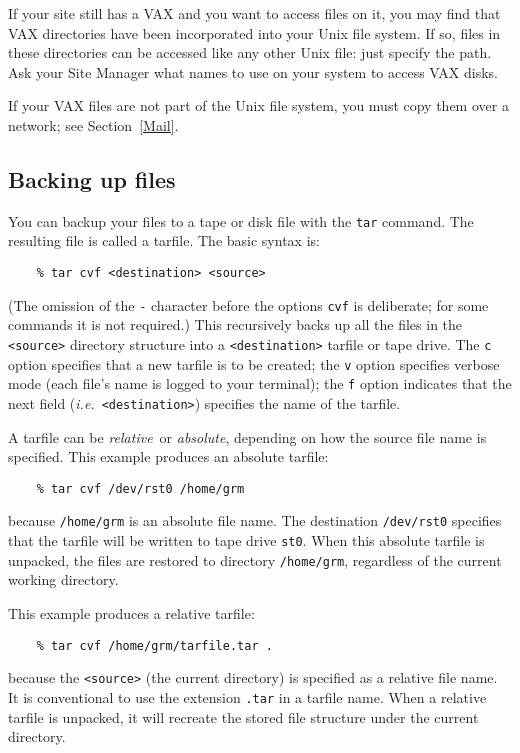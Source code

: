 If your site still has a VAX and you want to access files on it, you may find
that VAX directories have been incorporated into your Unix file system.
If so, files in these directories can be accessed like any other Unix file: just
specify the path.
Ask your Site Manager what names to use on your system to access VAX disks.

If your VAX files are not part of the Unix file system, you must copy
them over a network; see Section~\ref{Mail}.

\subsection{Backing up files}

You can backup your files to a tape or disk file with the {\tt tar} command.
The resulting file is called a tarfile.
The basic syntax is:
\begin{verbatim}
    % tar cvf <destination> <source>
\end{verbatim}
(The omission of the {\tt -} character before the options {\tt cvf} is
deliberate; for some commands it is not required.)
This recursively backs up all the files in the {\tt <source>} directory
structure into a {\tt <destination>} tarfile or tape drive.
The {\tt c} option specifies that a new tarfile is to be created;
the {\tt v} option specifies verbose mode (each file's name is logged to your
terminal);
the {\tt f} option indicates that the next field ({\em i.e.}\,
{\tt <destination>}) specifies the name of the tarfile.

A tarfile can be {\em relative}\, or {\em absolute}, depending on how the
source file name is specified.
This example produces an absolute tarfile:
\begin{verbatim}
    % tar cvf /dev/rst0 /home/grm
\end{verbatim}
because {\tt /home/grm} is an absolute file name.
The destination {\tt /dev/rst0} specifies that the tarfile will be written to
tape drive {\tt st0}.
When this absolute tarfile is unpacked, the files are restored to directory
{\tt /home/grm}, regardless of the current working directory.

This example produces a relative tarfile:
\begin{verbatim}
    % tar cvf /home/grm/tarfile.tar .
\end{verbatim}
because the {\tt <source>} (the current directory) is specified as a
relative file name.
It is conventional to use the extension {\tt .tar} in a tarfile name.
When a relative tarfile is unpacked, it will recreate the stored file
structure under the current directory.

